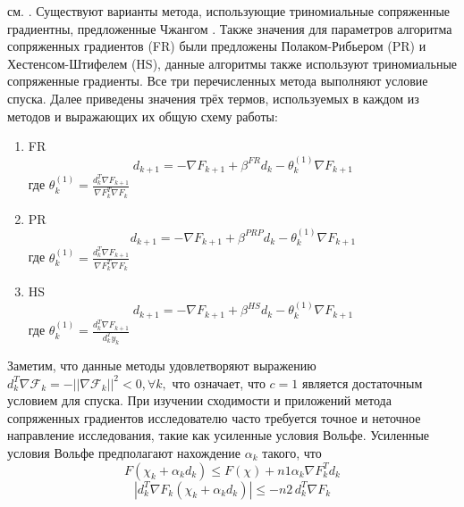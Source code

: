 см. \cite{art8,art9,art10,art11,art12,art13,art14,art15}. Существуют варианты
метода, использующие триномиальные сопряженные градиентны, предложенные Чжангом
\cite{art16}. Также значения для параметров алгоритма сопряженных градиентов
(FR) были предложены Полаком-Рибьером (PR) и Хестенсом-Штифелем (HS), данные
алгоритмы также используют триномиальные сопряженные градиенты. Все три
перечисленных метода выполняют условие спуска. Далее приведены значения трёх
термов, используемых в каждом из методов и выражающих их общую схему работы:

\begin{enumerate}
    \item FR
    \begin{equation*}
        d_{k+1}=-\nabla F_{k+1}+\beta^{F R}d_{k}-\theta_{k}^{(1)}\nabla F_{k+1}
    \end{equation*}
    где $ \theta_{k}^{(1)}=\frac{d_{k}^{T}\nabla F_{k+1}}{\nabla F_{k}^{T}\nabla F_{k}} $
    \item PR
    \begin{equation*}
        d_{k+1}=-\nabla F_{k+1}+\beta^{P R P}d_{k}-\theta_{k}^{(1)}\nabla F_{k+1}
    \end{equation*}
    где $\theta_{k}^{(1)}=\frac{d_{k}^{T}\nabla F_{k+1}}{\nabla F_{k}^{T}\nabla F_{k}}$
    \item HS
    \begin{equation*}
        d_{k+1}=-\nabla F_{k+1}+\beta^{H S}d_{k}-\theta_{k}^{(1)}\nabla F_{k+1}
    \end{equation*}
    где $ \theta_{k}^{(1)}=\frac{d_{k}^{T}\nabla F_{k+1}}{d_{k}^{T}y_{k}} $
\end{enumerate}

Заметим, что данные методы удовлетворяют выражению $d_{k}^{T}\mathcal{\nabla
F}_{k}=-||\mathcal{\nabla F}_{k}||^{2}<0,\forall k,$ что означает, что $c = 1$
является достаточным условием для спуска. При изучении сходимости и приложений
метода сопряженных градиентов исследователю часто требуется точное и неточное
направление исследования, такие как усиленные условия Вольфе. Усиленные условия
Вольфе предполагают нахождение $\alpha_{k}$ такого, что
\begin{equation}\label{eqn:eq5}
    F(\chi_{k}+\alpha_{k}d_{k})\leq F(\chi) + n1 \alpha_{k} \nabla F_{k}^{T}d_{k}
\end{equation}
\begin{equation}\label{eqn:eq6}
    |d_{k}^{T}\nabla F_{k}(\chi_{k}+\alpha_{k}d_{k})|\leq-n2\,d_{k}^{T}\nabla F_{k}
\end{equation}


